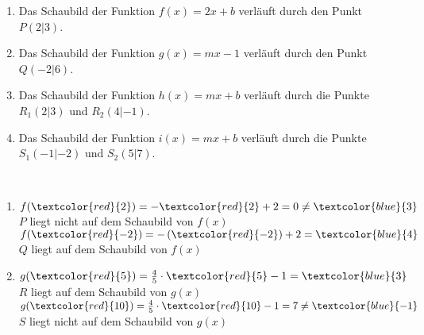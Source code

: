 \begin{Exercise}[title={Bestimme die Funktionsgleichung}, label=punktprobeA2]
	\begin{enumerate}[label=\alph*)]
		\item Das Schaubild der Funktion $f(x)=2x+b$ verläuft durch den Punkt $P(2|3)$.
		\item Das Schaubild der Funktion $g(x)=mx-1$ verläuft durch den Punkt $Q(-2|6)$.
		\item Das Schaubild der Funktion $h(x)=mx+b$ verläuft durch die Punkte $R_1(2|3)$ und $R_2(4|-1)$.
		\item Das Schaubild der Funktion $i(x)=mx+b$ verläuft durch die Punkte $S_1(-1|-2)$ und $S_2(5|7)$.
	\end{enumerate}
\end{Exercise}
\newpage
\begin{Answer}[ref=punktprobeA1]\\
	\begin{minipage}{0.5\textwidth}
		\begin{enumerate}[label=\alph*)]
			\item $f(\textcolor{red}{2})=-\textcolor{red}{2}+2=0\neq\textcolor{blue}{3}$\\
			$P$ liegt nicht auf dem Schaubild von $f(x)$\\
			$f(\textcolor{red}{-2})=-\left(\textcolor{red}{-2}\right)+2=\textcolor{blue}{4}$\\
			$Q$ liegt auf dem Schaubild von $f(x)$
		\end{enumerate}
	\end{minipage}
	\begin{minipage}{0.5\textwidth}
		\begin{enumerate}[label=\alph*)]
			\setcounter{enumi}{1}
			\item $g(\textcolor{red}{5})=\tfrac{4}{5}\cdot\textcolor{red}{5}-1=\textcolor{blue}{3}$\\
			$R$ liegt auf dem Schaubild von $g(x)$\\
			$g(\textcolor{red}{10})=\tfrac{4}{5}\cdot\textcolor{red}{10}-1=7\neq\textcolor{blue}{-1}$\\
			$S$ liegt nicht auf dem Schaubild von $g(x)$
		\end{enumerate}
	\end{minipage}
\end{Answer}
\vspace{1cm}
